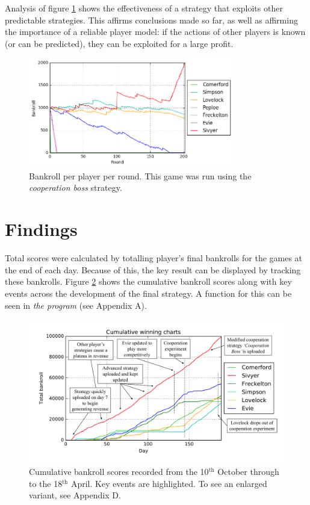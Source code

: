 \documentclass[11pt, twoside]{article}
\begin{document}
Analysis of figure \ref{CartelBoss} shows the effectiveness of a strategy that exploits other predictable strategies. This affirms conclusions made so far, as well as affirming the importance of a reliable player model: if the actions of other players is known (or can be predicted), they can be exploited for a large profit.

\begin{figure}[h!]
	\centering
	\includegraphics[width=0.8\textwidth,keepaspectratio]{cartel_boss.png}
	\caption{Bankroll per player per round. This game was run using the \textit{cooperation boss} strategy.}
	\label{CartelBoss}
\end{figure}

\newpage

\section{Findings} \label{Section4}

Total scores were calculated by totalling player's final bankrolls for the games at the end of each day. Because of this, the key result can be displayed by tracking these bankrolls. Figure \ref{GameHistory} shows the cumulative bankroll scores along with key events across the development of the final strategy. A function for this can be seen in \textit{the program} (see Appendix A).

\begin{figure}[h]
	\centering
	\includegraphics[width=\textwidth, keepaspectratio]{HistoryOfReport.pdf}
	\caption{Cumulative bankroll scores recorded from the 10$^{\text{th}}$ October through to the 18$^{\text{th}}$ April. Key events are highlighted. To see an enlarged variant, see Appendix D.}
	\label{GameHistory}
\end{figure}
\end{document}
